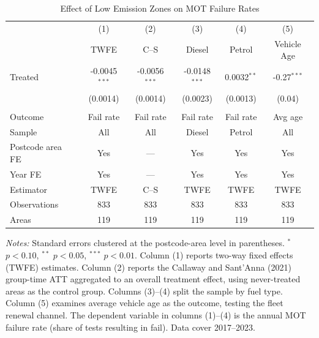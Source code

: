 \begin{table}[H]
\centering
\caption{Effect of Low Emission Zones on MOT Failure Rates}
\label{tab:main}
\begin{threeparttable}
\begin{tabular}{lccccc}
\toprule
 & (1) & (2) & (3) & (4) & (5) \\
 & TWFE & C--S & Diesel & Petrol & Vehicle Age \\
\midrule
Treated & -0.0045$^{***}$ & -0.0056$^{***}$ & -0.0148$^{***}$ & 0.0032$^{**}$ & -0.27$^{***}$ \\
 & (0.0014) & (0.0014) & (0.0023) & (0.0013) & (0.04) \\
\\
Outcome & Fail rate & Fail rate & Fail rate & Fail rate & Avg age \\
Sample & All & All & Diesel & Petrol & All \\
Postcode area FE & Yes & --- & Yes & Yes & Yes \\
Year FE & Yes & --- & Yes & Yes & Yes \\
Estimator & TWFE & C--S & TWFE & TWFE & TWFE \\
Observations & 833 & 833 & 833 & 833 & 833 \\
Areas & 119 & 119 & 119 & 119 & 119 \\
\bottomrule
\end{tabular}
\begin{tablenotes}[flushleft]
\small
\item \textit{Notes:} Standard errors clustered at the postcode-area level in parentheses. $^{*}$ $p<0.10$, $^{**}$ $p<0.05$, $^{***}$ $p<0.01$. Column (1) reports two-way fixed effects (TWFE) estimates. Column (2) reports the Callaway and Sant'Anna (2021) group-time ATT aggregated to an overall treatment effect, using never-treated areas as the control group. Columns (3)--(4) split the sample by fuel type. Column (5) examines average vehicle age as the outcome, testing the fleet renewal channel. The dependent variable in columns (1)--(4) is the annual MOT failure rate (share of tests resulting in fail). Data cover 2017--2023.
\end{tablenotes}
\end{threeparttable}
\end{table}
